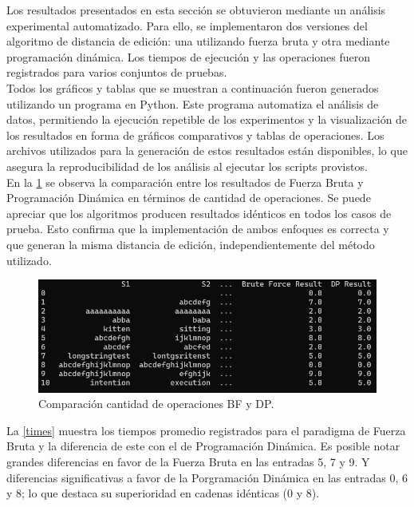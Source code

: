 Los resultados presentados en esta sección se obtuvieron mediante un análisis experimental automatizado. Para ello, se implementaron dos versiones del algoritmo de distancia de edición: una utilizando fuerza bruta y otra mediante programación dinámica. Los tiempos de ejecución y las operaciones fueron registrados para varios conjuntos de pruebas.\\

\noindent Todos los gráficos y tablas que se muestran a continuación fueron generados utilizando un programa en Python. Este programa automatiza el análisis de datos, permitiendo la ejecución repetible de los experimentos y la visualización de los resultados en forma de gráficos comparativos y tablas de operaciones. Los archivos utilizados para la generación de estos resultados están disponibles, lo que asegura la reproducibilidad de los análisis al ejecutar los scripts provistos.\\

\noindent En la \cref{cantOpe} se observa la comparación entre los resultados de Fuerza Bruta y Programación Dinámica en términos de cantidad de operaciones. Se puede apreciar que los algoritmos producen resultados idénticos en todos los casos de prueba. Esto confirma que la implementación de ambos enfoques es correcta y que generan la misma distancia de edición, independientemente del método utilizado.

\begin{figure}[H]
    \centering
    \includegraphics[width=\textwidth]{images/cantOpe.png}
    \caption{Comparación cantidad de operaciones BF y DP.}
    \label{cantOpe}
\end{figure}

\noindent La \cref{times} muestra los tiempos promedio registrados para el paradigma de Fuerza Bruta y la diferencia de este con el de Programación Dinámica. Es posible notar grandes diferencias en favor de la Fuerza Bruta en las entradas 5, 7 y 9. Y diferencias significativas a favor de la Porgramación Dinámica en las entradas 0, 6 y 8; lo que destaca su superioridad en cadenas idénticas (0 y 8).

